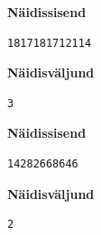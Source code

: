 \documentclass{trkut}
\begin{document}
\textbf{Näidissisend}

\begin{verbatim}
1817181712114
\end{verbatim}

\textbf{Näidisväljund}

\begin{verbatim}
3
\end{verbatim}





\textbf{Näidissisend}

\begin{verbatim}
14282668646
\end{verbatim}

\textbf{Näidisväljund}

\begin{verbatim}
2
\end{verbatim}
\end{document}
